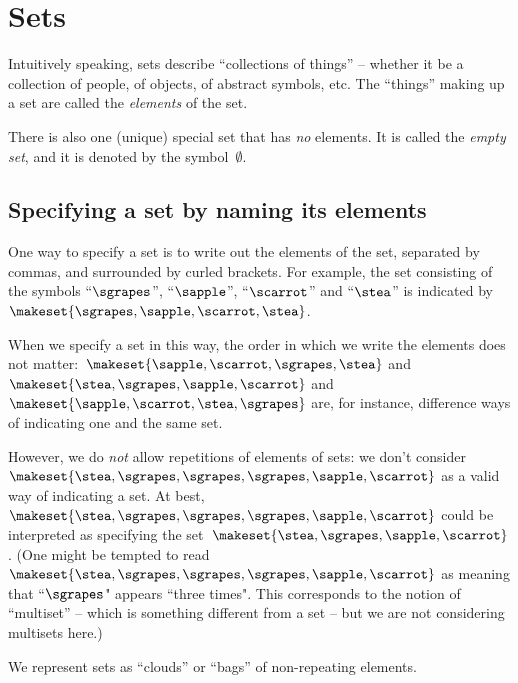 
\section{Sets}

Intuitively speaking, sets describe ``collections of things'' -- whether it be a collection of people, of objects, of abstract symbols, etc.
The ``things'' making up a set are called the \emph{elements} of the set.

There is also one (unique) special set that has \emph{no} elements.
It is called the \emph{empty set}, and it is denoted by the symbol~$\emptyset$.

\subsection{Specifying a set by naming its elements}

One way to specify a set is to write out the elements of the set, separated by commas, and surrounded by curled brackets.
For example, the set consisting of the symbols ``$\sgrapes$'', ``$\sapple$'', ``$\scarrot$'' and ``$\stea$'' is indicated by~$\makeset{ \sgrapes, \sapple, \scarrot, \stea}$.

When we specify a set in this way, the order in which we write the elements does not matter:~$\makeset{ \sapple, \scarrot, \sgrapes, \stea}$ and~$\makeset{ \stea, \sgrapes, \sapple, \scarrot}$ and~$\makeset{ \sapple, \scarrot, \stea, \sgrapes}$ are, for instance, difference ways of indicating one and the same set.

However, we do \emph{not} allow repetitions of elements of sets: we don't consider~$\makeset{ \stea, \sgrapes, \sgrapes, \sgrapes, \sapple, \scarrot }$ as a valid way of indicating a set.
At best,~$\makeset{ \stea, \sgrapes, \sgrapes, \sgrapes, \sapple, \scarrot }$ could be interpreted as specifying the set~$\makeset{ \stea, \sgrapes, \sapple, \scarrot }$.
(One might be tempted to read $\makeset{ \stea, \sgrapes, \sgrapes, \sgrapes, \sapple, \scarrot }$ as meaning that ``$\sgrapes$" appears ``three times".
This corresponds to the notion of ``multiset'' -- which is something different from a set -- but we are not considering multisets here.)

\begin{marginfigure}
    \centering
    \caption{We represent sets as ``clouds'' or ``bags'' of non-repeating elements.}
    \label{fig:set_as_clouds}
\end{marginfigure}

